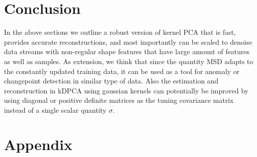 \documentclass[10pt, conference, compsocconf]{IEEEtran}
\begin{document}
\section{Conclusion}\label{section:end}

In the above sections we outline a robust version of kernel PCA that is fast, provides accurate reconstructions, and most importantly can be scaled to denoise data streams with non-regular shape features that have large amount of features as well as samples. As extension, we think that since the quantity MSD adapts to the constantly updated training data, it can be used as a tool for anomaly or changepoint detection in similar type of data. Also the estimation and reconstruction in kDPCA using gaussian kernels can potentially be improved by using diagonal or positive definite matrices as the tuning covariance matrix instead of a single scalar quantity $\sigma$.




\section*{Appendix}
\end{document}
